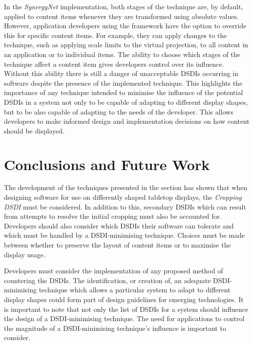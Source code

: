 \documentclass{bmcart}
\begin{document}
In the {\emph{SynergyNet}} implementation, both stages of the technique are, by default, applied to content items whenever they are transformed using absolute values.
However, application developers using the framework have the option to override this for specific content items.
For example, they can apply changes to the technique, such as applying scale limits to the virtual projection, to all content in an application or to individual items.
The ability to choose which stages of the technique affect a content item gives developers control over its influence.
Without this ability there is still a danger of unacceptable \acp{DSDI} occurring in software despite the presence of the implemented technique.
This highlights the importance of any technique intended to minimise the influence of the potential \acp{DSDI} in a system not only to be capable of adapting to different display shapes, but to be also capable of adapting to the needs of the developer. 
This allows developers to make informed design and implementation decisions on how content should be displayed.

\section*{Conclusions and Future Work}
\label{sec:conclusion}

The development of the techniques presented in the  section has shown that when designing software for use on differently shaped tabletop displays, the {\emph{Cropping \ac{DSDI}}} must be considered.
In addition to this, secondary \acp{DSDI} which can result from attempts to resolve the initial cropping must also be accounted for.
Developers should also consider which \acp{DSDI} their software can tolerate and which must be handled by a \ac{DSDI}-minimising technique.
Choices must be made between whether to preserve the layout of content items or to maximise the display usage.

Developers must consider the implementation of any proposed method of countering the \acp{DSDI}.
The identification, or creation of, an adequate \ac{DSDI}-minimising technique which allows a particular system to adapt to different display shapes could form part of design guidelines for emerging technologies.
It is important to note that not only the list of \acp{DSDI} for a system should influence the design of a \ac{DSDI}-minimising technique.
The need for applications to control the magnitude of a \ac{DSDI}-minimising technique's influence is important to consider.
\end{document}
